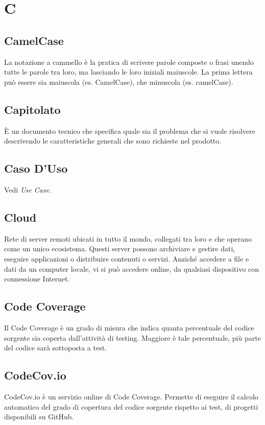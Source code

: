 \section*{C}

\subsection{CamelCase}
La notazione a cammello è la pratica di scrivere parole composte o frasi unendo tutte le parole tra loro, ma lasciando le loro iniziali maiuscole. La prima lettera può essere sia maiuscola (es. CamelCase), che minuscola (es. camelCase).

\subsection{Capitolato}
È un documento tecnico che specifica quale sia il problema che si vuole risolvere descrivendo le caratteristiche generali che sono richieste nel prodotto.

\subsection{Caso D'Uso}
Vedi \textit{Use Case}.

\subsection{Cloud}
Rete di server remoti ubicati in tutto il mondo, collegati tra loro e che operano come un unico ecosistema. Questi server possono archiviare e gestire dati, eseguire applicazioni o distribuire contenuti o servizi. Anziché accedere a file e dati da un computer locale, vi si può accedere online, da qualsiasi dispositivo con connessione Internet.

\subsection{Code Coverage}
Il Code Coverage è un grado di misura che indica quanta percentuale del codice sorgente sia coperta dall'attività di testing. Maggiore è tale percentuale, più parte del codice sarà sottoposta a test.

\subsection{CodeCov.io}
CodeCov.io è un servizio online di Code Coverage. Permette di eseguire il calcolo automatico del grado di copertura del codice sorgente rispetto ai test, di progetti disponibili su GitHub.

